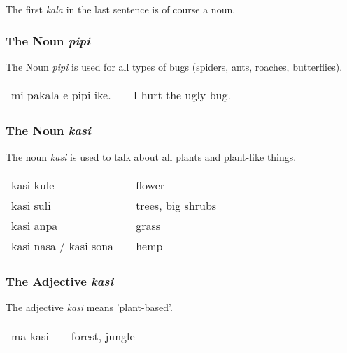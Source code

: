 The first \textit{kala} in the last sentence is of course a noun. 

%
%
\subsubsection*{The Noun \textit{pipi}}
%
%
The Noun \textit{pipi} is used for all types of bugs (spiders, ants, roaches, butterflies). 

\begin{supertabular}{p{5,5cm}|ll}
mi pakala e pipi ike. && I hurt the ugly bug.  \\
\end{supertabular} 

%
%
\subsubsection*{The Noun \textit{kasi}}
%
%
The noun \textit{kasi} is used to talk about all plants and plant-like things. 

\begin{supertabular}{p{5,5cm}|ll}
kasi kule && flower \\
kasi suli && trees, big shrubs \\
kasi anpa && grass \\
kasi nasa / kasi sona && hemp  \\
\end{supertabular} 

%
%
\subsubsection*{The Adjective \textit{kasi}}
%
%
The adjective \textit{kasi} means 'plant-based'.

\begin{supertabular}{p{5,5cm}|ll}
ma kasi && forest, jungle \\
\end{supertabular} 

%
%
